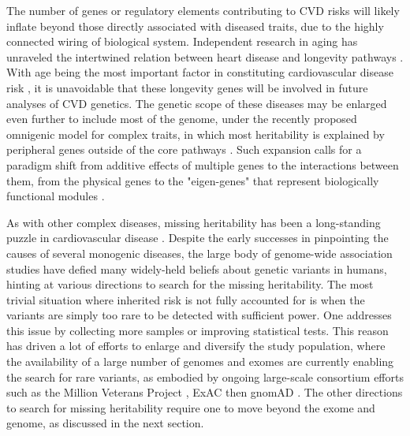 \documentclass[letter]{bioinfo}
\begin{document}
The number of genes or regulatory elements contributing to CVD risks will likely inflate beyond those directly associated with diseased traits, due to the highly connected wiring of biological system.
Independent research in aging has unraveled the intertwined relation between heart disease and longevity pathways \citep{North:2012:Intersection}.  With age being the most important factor in constituting cardiovascular disease risk \citep{Steenman:2017:Cardiac}, it is unavoidable that these longevity genes will be involved in future analyses of CVD genetics. The genetic scope of these diseases may be enlarged even further to include most of the genome, under the recently proposed omnigenic model for complex traits, in which most heritability is explained by peripheral genes outside of the core pathways \citep{Boyle:2017:Expanded}. Such expansion calls for a paradigm shift from additive effects of multiple genes to the interactions between them, from the physical genes to the "eigen-genes" that represent biologically functional modules \citep{Weiss:2012:Good}.
	
As with other complex diseases, missing heritability has been a long-standing puzzle in cardiovascular disease \citep{Manolio:2009:Finding}. Despite the early successes in pinpointing the causes of several monogenic diseases, the large body of genome-wide association studies have defied many widely-held beliefs about genetic variants in humans, hinting at various directions to search for the missing heritability.  The most trivial situation where inherited risk is not fully accounted for is when the variants are simply too rare to be detected with sufficient power. One addresses this issue by collecting more samples or improving statistical tests.  This reason has driven a lot of efforts to enlarge and diversify the study population, where the availability of a large number of genomes and exomes are currently enabling the search for rare variants, as embodied by ongoing large-scale consortium efforts such as the Million Veterans Project \citep{Gaziano:2016:Million}, ExAC then gnomAD \citep{Lek:2016:Analysis}. The other directions to search for missing heritability require one to move beyond the exome and genome, as discussed in the next section.
	
\end{document}
